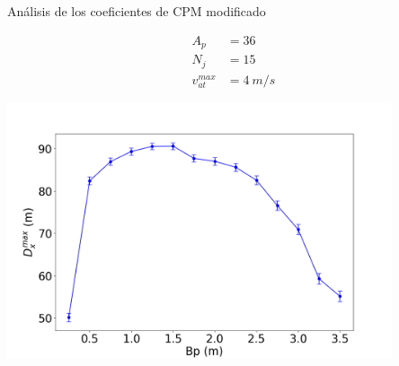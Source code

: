 \begin{frame}{Análisis de los coeficientes de CPM modificado}
    \begin{center}
        \begin{minipage}{0.15\textwidth}
            \begin{equation*}
                \begin{aligned}
                    A_p &= 36 \\
                    N_j &= 15 \\
                    v_{at}^{max} &= 4\ m/s
                \end{aligned}
            \end{equation*}
        \end{minipage}
        \begin{minipage}{0.80\textwidth}
            \hfill\includegraphics[width=0.85\textwidth]{pic/05-resultados/r8}
        \end{minipage}
    \end{center}
    \footnotesize{}
\end{frame}


